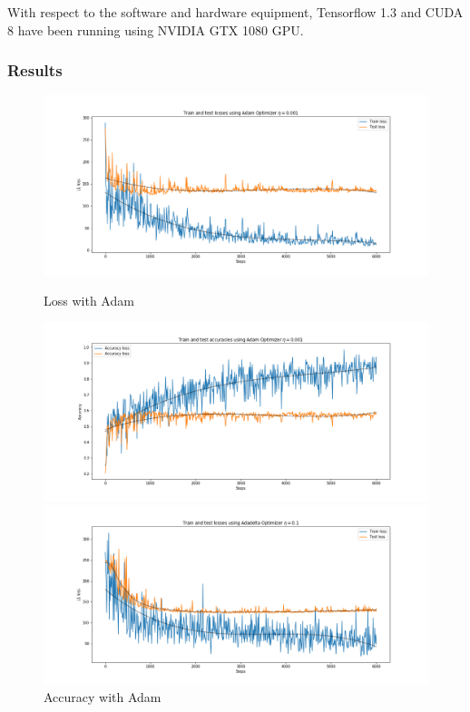 \documentclass{article}
\begin{document}
With respect to the software and hardware equipment, Tensorflow 1.3 and CUDA 8 have been running using NVIDIA GTX 1080 GPU.
 \newpage 
 \subsubsection{Results}\vspace{-0.5cm}
 
 \begin{figure}[ht] 
  \begin{minipage}[b]{0.5\linewidth}
    \centering
    \includegraphics[width=1.1\linewidth]{loss_adam.png} 
    \caption{Loss with Adam} 
  \end{minipage}
  \begin{minipage}[b]{0.5\linewidth}
    \centering
    \includegraphics[width=1.1\linewidth]{acc_adam.png} 
    \caption{Accuracy with Adam}
  \end{minipage} 
  \begin{minipage}[b]{0.5\linewidth}
    \centering
    \includegraphics[width=1.1\linewidth]{loss_adadel.png} 

\end{minipage}
\end{figure}
\end{document}
